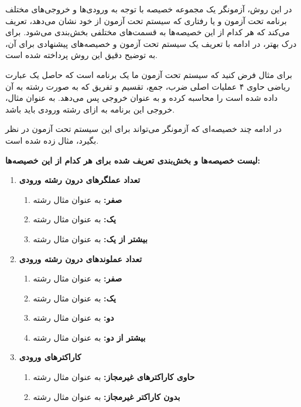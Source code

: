 در این روش، آزمونگر یک مجموعه خصیصه با توجه به ورودی‌ها و خروجی‌های مختلف برنامه تحت آزمون و یا رفتاری که سیستم تحت آزمون از خود نشان می‌دهد، تعریف می‌کند که هر کدام از این خصیصه‌ها به قسمت‌های مختلفی بخش‌بندی می‌شود. برای درک بهتر، در ادامه با تعریف یک سیستم تحت آزمون و خصیصه‌های پیشنهادی برای آن، به توضیح دقیق این روش پرداخته شده است.

برای مثال فرض کنید که سیستم تحت آزمون ما یک برنامه است که حاصل یک عبارت ریاضی حاوی ۴ عملیات اصلی ضرب، جمع، تقسیم و تفریق که به صورت رشته به آن داده شده است را محاسبه کرده و به عنوان خروجی پس می‌دهد. به عنوان مثال، خروجی این برنامه به ازای رشته ورودی  باید  باشد.

در ادامه چند خصیصه‌ای که آزمونگر می‌تواند برای این سیستم تحت آزمون در نظر بگیرد، مثال زده شده است.

\textbf{لیست خصیصه‌ها و بخش‌بندی تعریف شده برای هر کدام از این خصیصه‌ها:}

\begin{enumerate}
	\item \textbf{تعداد عملگرهای درون رشته ورودی}
	\begin{enumerate}
		\item \textbf{صفر:} به عنوان مثال رشته 
		\item \textbf{یک:} به عنوان مثال رشته 
		\item \textbf{بیشتر از یک:} به عنوان مثال رشته 
	\end{enumerate}
	
	\item \textbf{تعداد عملوندهای درون رشته ورودی}
	\begin{enumerate}
		\item \textbf{صفر:} به عنوان مثال رشته 
		\item \textbf{یک:} به عنوان مثال رشته 
		\item \textbf{دو:} به عنوان مثال رشته 
		\item \textbf{بیشتر از دو:} به عنوان مثال رشته 
	\end{enumerate}
	
	\item \textbf{کاراکترهای ورودی}
	\begin{enumerate}
		\item \textbf{حاوی کاراکترهای غیرمجاز:} به عنوان مثال رشته 
		\item \textbf{بدون کاراکتر غیرمجاز:} به عنوان مثال رشته 
	\end{enumerate}
\end{enumerate}

